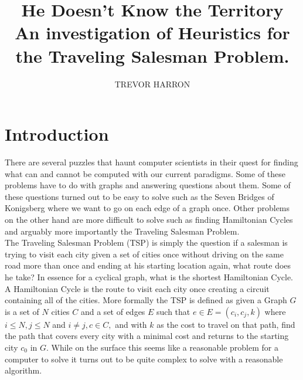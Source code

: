 \documentclass[midd]{thesis}
\title{He Doesn't Know the Territory\\
\small{An investigation of Heuristics for the Traveling Salesman Problem.}}
\author{TREVOR HARRON}
\newcommand{\tab}{\hspace*{2em}}
\begin{document}
\maketitle

\contentspage

\chapter{Introduction}
\tab There are several puzzles that haunt computer scientists in their quest for finding what can and cannot be computed with our current paradigms. Some of these problems have to do with graphs and answering questions about them. Some of these questions turned out to be easy to solve such as the Seven Bridges of Konigsberg where we want to go on each edge of a graph once. Other problems on the other hand are more difficult to solve such as finding Hamiltonian Cycles and arguably more importantly the Traveling Salesman Problem.\\
\tab The Traveling Salesman Problem (TSP) is simply the question if a salesman is trying to visit each city given a set of cities once without driving on the same road more than once and ending at his starting location again, what route does he take? In essence for a cyclical graph, what is the shortest Hamiltonian Cycle. A Hamiltonian Cycle is the route to visit each city once creating a circuit containing all of the cities. More formally the TSP is defined as given a Graph $G$ is a set of $N$ cities $C$ and a set of edges $E$ such that $e \in E = (c_{i}, c_{j},k)$ where $i \le N, j \le N$ and $i \ne j, c \in C,$ and with $k$ as the cost to travel on that path, find the path that covers every city with a minimal cost and returns to the starting city $c_{0}$ in $G$. While on the surface this seems like  a reasonable problem for a computer to solve it turns out to be quite complex to solve with a reasonable algorithm.\\
\end{document}
